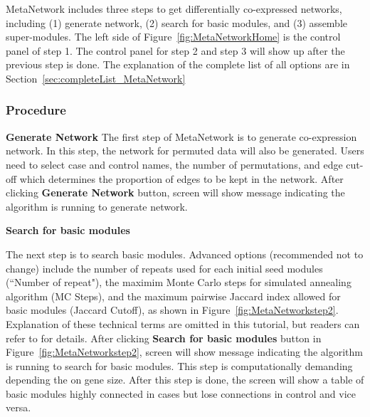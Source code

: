 MetaNetwork includes three steps to get differentially co-expressed networks,
including (1) generate network, (2) search for basic modules, and (3) assemble super-modules. 
The left side of Figure~\ref{fig:MetaNetworkHome} is the control panel of step 1. 
The control panel for step 2 and step 3 will show up after the previous step is done.
The explanation of the complete list of all options are in Section~\ref{sec:completeList_MetaNetwork}


\subsubsection{Procedure}

\begin{steps}
\item \textbf{Generate Network}
The first step of MetaNetwork is to generate co-expression network. 
In this step, the network for permuted data will also be generated. 
Users need to select case and control names, the number of permutations, and edge cut-off which determines the proportion of edges to be kept in the network. 
After clicking \textbf{Generate Network} button, screen will show message indicating the algorithm is running to generate network.

\item \textbf{Search for basic modules}

The next step is to search basic modules.
Advanced options (recommended not to change) include the number of repeats used for each initial seed modules (``Number of repeat"),
the maximim Monte Carlo steps for simulated annealing algorithm (MC Steps),
and the maximum pairwise Jaccard index allowed for basic modules (Jaccard Cutoff), as shown in Figure~\ref{fig:MetaNetworkstep2}.
Explanation of these technical terms are omitted in this tutorial,
but readers can refer to \cite{zhu2016metadcn} for details.
After clicking \textbf{Search for basic modules} button in Figure~\ref{fig:MetaNetworkstep2}, 
screen will show message indicating the algorithm is running to search for basic modules.
This step is computationally demanding depending the on gene size.
After this step is done,
the screen will show a table of basic modules highly connected in cases but lose connections in control and vice versa.



\end{steps}
